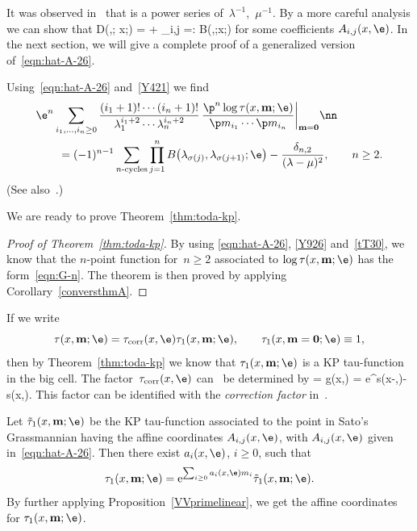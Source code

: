 It was observed in~\cite[(99)]{Y} that
is a power series of~$\lambda^{-1}$,~$\mu^{-1}$.
By a more careful analysis we can show that
\beq\label{eqn:hat-A-26}
 D(\lambda,\mu; x;\e)  =
 + \sum_{i,j}  =: B(\lambda,\mu;x;\e)
\eeq
for some coefficients $A_{i,j}(x,\e)$.
In the next section, we will give a complete proof of a generalized version of~\eqref{eqn:hat-A-26}.

Using~\eqref{eqn:hat-A-26} and~\eqref{Y421} we find
\begin{align}
&\e^n \sum_{i_1,\dots,i_n\ge0}
\frac{(i_1+1)! \cdots (i_n+1)!} {\lambda_1^{i_1+2}\cdots \lambda_n^{i_n+2}} \,
\frac{\p^n \log \tau(x,{\bf m};\e)}{\p m_{i_1} \cdots \p m_{i_n}}\bigg|_{{\bf m}={\bf 0}}\nn \\
&\qquad= (-1)^{n-1} \sum_{\text{$n$-cycles}}
\prod_{j=1}^n B\bigl(\lambda_{\sigma(j)},\lambda_{\sigma(j+1)};\e\bigr) - \frac{\delta_{n,2}}{(\lambda-\mu)^2}, \qquad n\ge2.\label{Y926}
\end{align}
(See also~\cite[Corollary~1]{Y}.)

We are ready to prove Theorem~\ref{thm:toda-kp}.

\begin{proof}[Proof of Theorem~\ref{thm:toda-kp}]
By using \eqref{eqn:hat-A-26}, \eqref{Y926} and~\eqref{tT30}, we know that the $n$-point function for~${n\ge2}$
associated to $\log\tau(x,{\bf m};\e)$ has the form~\eqref{eqn:G-n}.
The theorem is then proved by applying Corollary~\ref{conversthmA}.
\end{proof}

If we write
\[
\tau(x,{\bf m};\e) = \tau_{\rm corr}(x,\e) \tau_1 (x,{\bf m};\e), \qquad \tau_1(x, {\bf m}={\bf 0};\e)\equiv1,
\]
then by Theorem~\ref{thm:toda-kp} we know that $\tau_1(x, {\bf m}; \e)$ is a KP tau-function in the big cell.
The factor~$\tau_{\rm corr}(x, \e)$ can~\cite{CDZ, Y} be determined by
\beq\label{correctionfactor}
 = g(x,\e) = {\rm e}^{s(x-\e,\e)-s(x,\e)}.
\eeq
This factor can be identified with the {\it correction factor} in~\cite{DY, Y, YZ}.

Let $\tilde{\tau}_1(x, {\bf m};\e)$ be the KP tau-function
associated to the point in Sato's Grassmannian having the affine coordinates
$A_{i,j}(x,\e)$, with $A_{i,j}(x,\e)$ given in~\eqref{eqn:hat-A-26}. Then there exist
$a_i(x,\e)$, $i\ge0$, such that
\[
\tau_1(x, {\bf m};\e) = {\rm e}^{\sum_{i\ge0} a_i(x,\e) m_i} \tilde{\tau}_1(x, {\bf m};\e).
\]
By further applying Proposition~\ref{VVprimelinear}, we get the affine coordinates for $\tau_1(x, {\bf m};\e)$.

